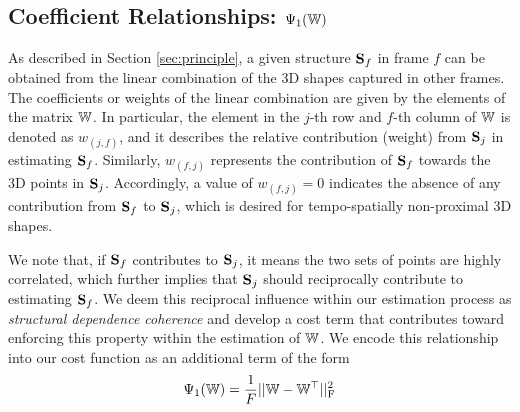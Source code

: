 \subsection{Coefficient Relationships: \texorpdfstring{$\Psi_1(\mathbb W)$}{psiallT}}
As described in Section \ref{sec:principle}, a given structure $\mathbf S_f$ in frame $f$ can be obtained from the linear combination of the 3D shapes captured in other frames. The coefficients or weights of the linear combination are given by the elements of the matrix $\mathbb W$. In particular, the element in the $j$-th row and $f$-th column  of $\mathbb W$ is denoted as $w_{(j,f)}$, and it describes the relative contribution (weight) from $\mathbf S_{j}$ in estimating $\mathbf S_{f}$.
Similarly, $w_{(f,j)}$ represents the contribution of $\mathbf S_{f}$ towards the 3D points in $\mathbf S_{j}$.
Accordingly, a value of $w_{(f,j)}=0$ indicates the absence of any contribution from $\mathbf S_{f}$ to $\mathbf S_{j}$, which is desired for tempo-spatially non-proximal 3D shapes.

We note that, if $\mathbf S_{f}$ contributes to $\mathbf S_{j}$, it means the two sets of points are highly correlated, which
further implies that  $\mathbf S_{j}$ should reciprocally contribute to estimating $\mathbf S_{f}$.
We deem this reciprocal influence within our estimation process as {\em structural dependence coherence} and develop a cost term that
contributes toward enforcing this property within the estimation of $\mathbb W$.
We encode this relationship into our cost function as an additional term of the form %
\begin{equation}
\Psi_1(\mathbb W) = \frac{1}{F} ||\mathbb W-\mathbb W^\top||_\text{F}^2
\end{equation}

